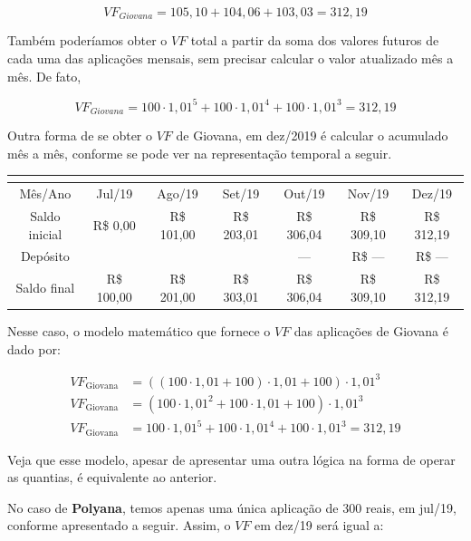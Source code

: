 $$VF_{Giovana}=105{,}10 + 104{,}06 + 103{,}03 = 312{,}19$$

Também poderíamos obter o $VF$ total a partir da soma dos valores futuros de cada uma das aplicações mensais, sem precisar calcular o valor atualizado mês a mês. De fato,

$$VF_{Giovana}=100\cdot1{,}01^5 + 100\cdot1{,}01^4 + 100\cdot1{,}01^3 = 312{,}19$$

Outra forma de se obter o $VF$ de Giovana, em dez/2019 é calcular o acumulado mês a mês, conforme se pode ver na representação temporal a seguir.

\begin{table}[H]
\centering
\begin{tabu} to \textwidth{|c|c|c|c|c|c|c|}
\hline
{}\\
\hline
Mês/Ano & Jul/19 & Ago/19 & Set/19 & Out/19 & Nov/19 & Dez/19 \\
\hline
Saldo inicial & R\$ 0,00 & R\$ 101,00 & R\$ 203,01 & R\$ 306,04 & R\$ 309,10 & R\$ 312,19 \\
\hline
Depósito & {} & {} & {} & --- & R\$ --- & R\$ ---\\
\hline
Saldo final & R\$ 100,00 & R\$ 201,00 & R\$ 303,01 &R\$ 306,04 & R\$ 309,10 & R\$ 312,19 \\
\hline
\end{tabu}
\end{table}

Nesse caso, o modelo matemático que fornece o $VF$ das aplicações de Giovana é dado por:

\begin{align*}
VF_{\text{Giovana}}&=((100\cdot1{,}01+100)\cdot1{,}01+100)\cdot1{,}01^3\\
VF_{\text{Giovana}}&=(100\cdot1{,}01^2+100\cdot1{,}01+100)\cdot1{,}01^3\\
VF_{\text{Giovana}}&=100\cdot1{,}01^5 + 100\cdot1{,}01^4 + 100\cdot1{,}01^3 = 312{,}19
\end{align*}


Veja que esse modelo, apesar de apresentar uma outra lógica na forma de operar as quantias, é equivalente ao anterior. 

No caso de \textbf{Polyana}, temos apenas uma única aplicação de 300 reais, em jul/19, conforme apresentado a seguir. Assim, o $VF$ em dez/19 será igual a:

